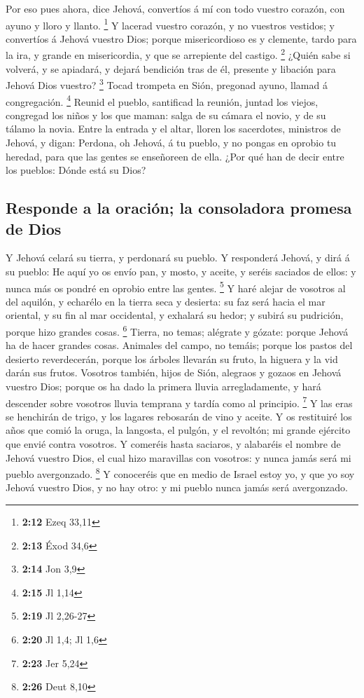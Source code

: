  Por eso pues ahora, dice Jehová, convertíos á mí con todo
vuestro corazón, con ayuno y lloro y llanto. \footnote{\textbf{2:12}
  Ezeq 33,11}  Y lacerad vuestro corazón, y no vuestros
vestidos; y convertíos á Jehová vuestro Dios; porque misericordioso es y
clemente, tardo para la ira, y grande en misericordia, y que se
arrepiente del castigo. \footnote{\textbf{2:13} Éxod 34,6} 
¿Quién sabe si volverá, y se apiadará, y dejará bendición tras de él,
presente y libación para Jehová Dios vuestro? \footnote{\textbf{2:14}
  Jon 3,9}  Tocad trompeta en Sión, pregonad ayuno, llamad
á congregación. \footnote{\textbf{2:15} Jl 1,14}  Reunid el
pueblo, santificad la reunión, juntad los viejos, congregad los niños y
los que maman: salga de su cámara el novio, y de su tálamo la novia.
 Entre la entrada y el altar, lloren los sacerdotes,
ministros de Jehová, y digan: Perdona, oh Jehová, á tu pueblo, y no
pongas en oprobio tu heredad, para que las gentes se enseñoreen de ella.
¿Por qué han de decir entre los pueblos: Dónde está su Dios?

\hypertarget{responde-a-la-oraciuxf3n-la-consoladora-promesa-de-dios}{%
\subsection{Responde a la oración; la consoladora promesa de
Dios}\label{responde-a-la-oraciuxf3n-la-consoladora-promesa-de-dios}}

 Y Jehová celará su tierra, y perdonará su pueblo.
 Y responderá Jehová, y dirá á su pueblo: He aquí yo os
envío pan, y mosto, y aceite, y seréis saciados de ellos: y nunca más os
pondré en oprobio entre las gentes. \footnote{\textbf{2:19} Jl 2,26-27}
 Y haré alejar de vosotros al del aquilón, y echarélo en la
tierra seca y desierta: su faz será hacia el mar oriental, y su fin al
mar occidental, y exhalará su hedor; y subirá su pudrición, porque hizo
grandes cosas. \footnote{\textbf{2:20} Jl 1,4; Jl 1,6} 
Tierra, no temas; alégrate y gózate: porque Jehová ha de hacer grandes
cosas.  Animales del campo, no temáis; porque los pastos
del desierto reverdecerán, porque los árboles llevarán su fruto, la
higuera y la vid darán sus frutos.  Vosotros también, hijos
de Sión, alegraos y gozaos en Jehová vuestro Dios; porque os ha dado la
primera lluvia arregladamente, y hará descender sobre vosotros lluvia
temprana y tardía como al principio. \footnote{\textbf{2:23} Jer 5,24}
 Y las eras se henchirán de trigo, y los lagares rebosarán
de vino y aceite.  Y os restituiré los años que comió la
oruga, la langosta, el pulgón, y el revoltón; mi grande ejército que
envié contra vosotros.  Y comeréis hasta saciaros, y
alabaréis el nombre de Jehová vuestro Dios, el cual hizo maravillas con
vosotros: y nunca jamás será mi pueblo avergonzado. \footnote{\textbf{2:26}
  Deut 8,10}  Y conoceréis que en medio de Israel estoy yo,
y que yo soy Jehová vuestro Dios, y no hay otro: y mi pueblo nunca jamás
será avergonzado.

